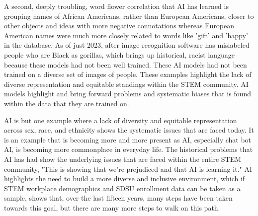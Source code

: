\documentclass{article}
\begin{document}
A second, deeply troubling, word flower correlation that AI has learned is grouping  names of African Americans, rather than European Americans, closer to other objects and ideas with more negative connotations whereas European American names were much more closely related to words like 'gift' and 'happy' in the database. As of just 2023, after image recognition software has mislabeled people who are Black as gorillas, which brings up historical, racist language because these models had not been well trained. These AI models had not been trained on a diverse set of images of people. These examples highlight the lack of diverse representation and equitable standings within the STEM community. AI models highlight and bring forward problems and systematic biases that is found within the data that they are trained on. \cite{devlin2017}\cite{grant2023}

AI is but one example where a lack of diversity and equitable representation across sex, race, and ethnicity shows the systematic issues that are faced today. It is an example that is becoming more and more present as AI, especially chat bot AI, is becoming more commonplace in everyday life. The historical problems that AI has had show the underlying issues that are faced within the entire STEM community, "This is showing that we're prejudiced and that AI is learning it."\cite{devlin2017} AI highlights the need to build a more diverse and inclusive environment, which if STEM workplace demographics and SDSU enrollment data can be taken as a sample, shows that, over the last fifteen years, many steps have been taken towards this goal, but there are many more steps to walk on this path.
\end{document}
